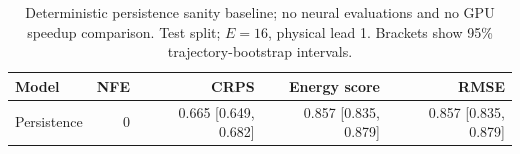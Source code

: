 \begin{table}[t]
\centering
\small
\setlength{\tabcolsep}{3pt}
\caption{Deterministic persistence sanity baseline; no neural evaluations and no GPU speedup comparison. Test split; $E=16$, physical lead 1. Brackets show 95\% trajectory-bootstrap intervals.}
\label{tab:persistence-quality}
\begin{tabular}{lrrrr}
\toprule
Model & NFE & CRPS & Energy score & RMSE \\
\midrule
Persistence & 0 & 0.665 [0.649, 0.682] & 0.857 [0.835, 0.879] & 0.857 [0.835, 0.879] \\
\bottomrule
\end{tabular}
\end{table}
